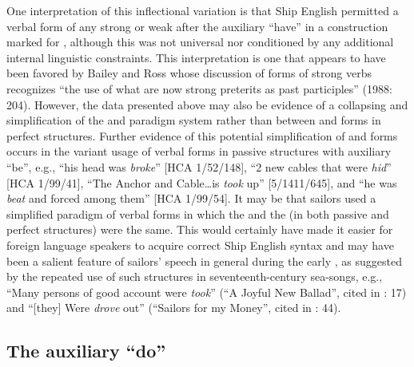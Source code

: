 One interpretation of this inflectional variation is that Ship English permitted a  verbal form of any strong or weak  after the auxiliary “have” in a construction marked for , although this was not universal nor conditioned by any additional internal linguistic constraints. This interpretation is one that appears to have been favored by Bailey and Ross whose discussion of  forms of strong verbs recognizes “the use of what are now strong preterits as past participles” (1988: 204). However, the data presented above may also be evidence of a collapsing and simplification of the  and  paradigm system rather than  between  and  forms in perfect structures. Further evidence of this potential simplification of  and  forms occurs in the variant usage of verbal forms in passive structures with auxiliary “be”, e.g., “his head was \textit{broke}” [HCA 1/52/148], “2 new cables that were \textit{hid}” [HCA 1/99/41], “The Anchor and Cable…is \textit{took} up” [5/1411/645], and “he was \textit{beat} and forced among them” [HCA 1/99/54]. It may be that sailors used a simplified paradigm of verbal forms in which the  and the  (in both passive and perfect structures) were the same. This would certainly have made it easier for foreign language speakers to acquire correct Ship English syntax and may have been a salient feature of sailors’ speech in general during the early , as suggested by the repeated use of such structures in seventeenth-century sea-songs, e.g., “Many persons of good account were \textit{took}” (“A Joyful New Ballad”, cited in \citealt{Palmer1986}: 17) and “[they] Were \textit{drove} out” (“Sailors for my Money”, cited in \citealt{Palmer1986}: 44). 

\subsection{{The auxiliary “do”}}\label{sec:6.4.2}

